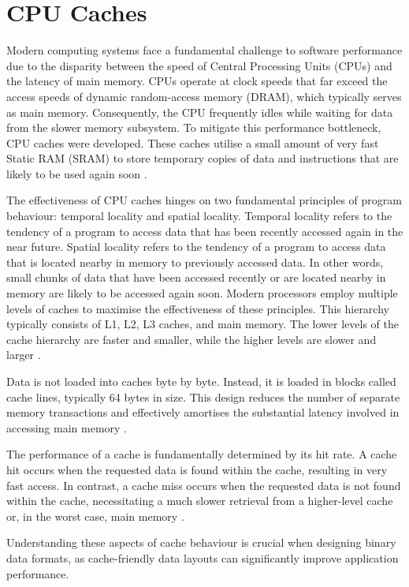 \section{CPU Caches}
\label{tb:cache}
Modern computing systems face a fundamental challenge to software performance due to the disparity between the speed of Central Processing Units (CPUs) and the latency of main memory. CPUs operate at clock speeds that far exceed the access speeds of dynamic random-access memory (DRAM), which typically serves as main memory. Consequently, the CPU frequently idles while waiting for data from the slower memory subsystem. To mitigate this performance bottleneck, CPU caches were developed. These caches utilise a small amount of very fast Static RAM (SRAM) to store temporary copies of data and instructions that are likely to be used again soon \citep{drepper_2007}.

The effectiveness of CPU caches hinges on two fundamental principles of program behaviour: temporal locality and spatial locality. Temporal locality refers to the tendency of a program to access data that has been recently accessed again in the near future. Spatial locality refers to the tendency of a program to access data that is located nearby in memory to previously accessed data. In other words, small chunks of data that have been accessed recently or are located nearby in memory are likely to be accessed again soon. Modern processors employ multiple levels of caches to maximise the effectiveness of these principles. This hierarchy typically consists of L1, L2, L3 caches, and main memory. The lower levels of the cache hierarchy are faster and smaller, while the higher levels are slower and larger \citep{drepper_2007}.

Data is not loaded into caches byte by byte. Instead, it is loaded in blocks called cache lines, typically 64 bytes in size. This design reduces the number of separate memory transactions and effectively amortises the substantial latency involved in accessing main memory \citep{drepper_2007}.

The performance of a cache is fundamentally determined by its hit rate. A cache hit occurs when the requested data is found within the cache, resulting in very fast access. In contrast, a cache miss occurs when the requested data is not found within the cache, necessitating a much slower retrieval from a higher-level cache or, in the worst case, main memory \citep{abayomi_2020}.

Understanding these aspects of cache behaviour is crucial when designing binary data formats, as cache-friendly data layouts can significantly improve application performance.


